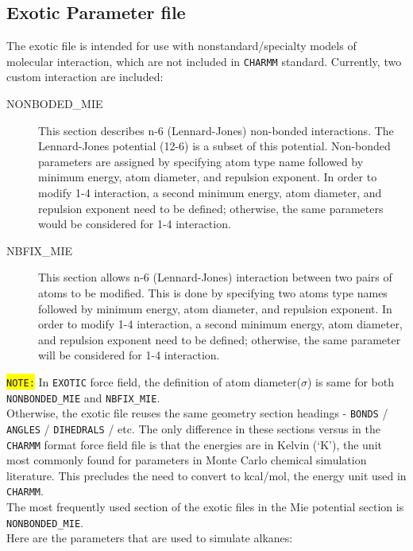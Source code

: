 \newpage
\subsection{Exotic Parameter file}
The exotic file is intended for use with nonstandard/specialty models of molecular interaction, which are not included in \texttt{CHARMM} standard. Currently, two custom interaction are included:
\begin{description}
\item [NONBODED\_MIE] This section describes n-6 (Lennard-Jones) non-bonded interactions. The Lennard-Jones potential (12-6) is a subset of this potential. Non-bonded parameters are assigned by specifying atom type name followed by minimum energy, atom diameter, and repulsion exponent. In order to modify 1-4 interaction, a second minimum energy, atom diameter, and repulsion exponent need to be defined; otherwise, the same parameters would be considered for 1-4 interaction.
\item [NBFIX\_MIE] This section allows n-6 (Lennard-Jones) interaction between two pairs of atoms to be modified. This is done by specifying two atoms type names followed by minimum energy, atom diameter, and repulsion exponent. In order to modify 1-4 interaction, a second minimum energy, atom diameter, and repulsion exponent need to be defined; otherwise, the same parameter will be considered for 1-4 interaction.
\end{description}
\colorbox{yellow}{\texttt{NOTE:}} In \texttt{EXOTIC} force field, the definition of atom diameter($\sigma$) is same for both \texttt{NONBONDED\_MIE} and \texttt{NBFIX\_MIE}.\\
Otherwise, the exotic file reuses the same geometry section headings - \texttt{BONDS} / \texttt{ANGLES} / \texttt{DIHEDRALS} / etc. The only difference in these sections versus in the \texttt{CHARMM} format force field file is that the energies are in Kelvin (`K'), the unit most commonly found for parameters in Monte Carlo chemical simulation literature. This precludes the need to convert to kcal/mol, the energy unit used in \texttt{CHARMM}.\\ The most frequently used section of the exotic files in the Mie potential section is \texttt{NONBONDED\_MIE}.\\
Here are the parameters that are used to simulate alkanes:\\\\
